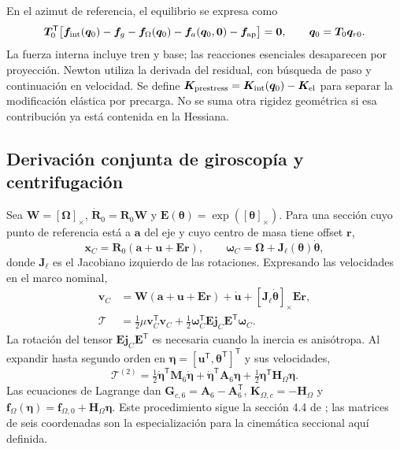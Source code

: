 \documentclass[oneside,a4paper,spanish,links,pagenumbers]{amca}
\newcommand{\Sx}[1]{[\bm{#1}]_\times}
\newcommand{\tr}{\mathsf T}
\begin{document}
En el azimut de referencia, el equilibrio se expresa como
\begin{equation}
 \bm T_0^\tr\big[\bm f_{\rm int}(\bm q_0)-\bm f_g-
 \bm f_\Omega(\bm q_0)-\bm f_a(\bm q_0,\bm0)-\bm f_{\rm ap}\big]=\bm0,
 \qquad \bm q_0=\bm T_0\bm q_{r0}.
 \label{eq:equilibrio}
\end{equation}
La fuerza interna incluye tren y base; las reacciones esenciales desaparecen por proyección. Newton utiliza la derivada del residual, con búsqueda de paso y continuación en velocidad. Se define $\bm K_{\rm prestress}=\bm K_{\rm int}(\bm q_0)-\bm K_{\rm el}$ para separar la modificación elástica por precarga. No se suma otra rigidez geométrica si esa contribución ya está contenida en la Hessiana.

\subsection{Derivación conjunta de giroscopía y centrifugación}
\label{sec:gyro}
Sea $\bm W=\Sx\Omega$, $\dot{\bm R}_0=\bm R_0\bm W$ y $\bm E(\bm\theta)=\exp(\Sx\theta)$. Para una sección cuyo punto de referencia está a $\bm a$ del eje y cuyo centro de masa tiene offset $\bm r$,
\begin{equation}
 \bm x_C=\bm R_0(\bm a+\bm u+\bm E\bm r),\qquad
 \bm\omega_C=\bm\Omega+\bm J_\ell(\bm\theta)\dot{\bm\theta},
\end{equation}
donde $\bm J_\ell$ es el Jacobiano izquierdo de las rotaciones. Expresando las velocidades en el marco nominal,
\begin{align}
 \bm v_C&=\bm W(\bm a+\bm u+\bm E\bm r)+\dot{\bm u}
       +[\bm J_\ell\dot{\bm\theta}]_\times\bm E\bm r,\\
 \mathcal T&=\tfrac12\mu\bm v_C^\tr\bm v_C
 +\tfrac12\bm\omega_C^\tr\bm E\bm j_C\bm E^\tr\bm\omega_C.
 \label{eq:energiaexacta}
\end{align}
La rotación del tensor $\bm E\bm j_C\bm E^\tr$ es necesaria cuando la inercia es anisótropa. Al expandir hasta segundo orden en $\bm\eta=[\bm u^\tr,\bm\theta^\tr]^\tr$ y sus velocidades,
\begin{equation}
 \mathcal T^{(2)}=\tfrac12\dot{\bm\eta}^\tr\bm M_6\dot{\bm\eta}
 +\dot{\bm\eta}^\tr\bm A_6\bm\eta
 +\tfrac12\bm\eta^\tr\bm H_\Omega\bm\eta.
 \label{eq:energia2}
\end{equation}
Las ecuaciones de Lagrange dan $\bm G_{c,6}=\bm A_6-\bm A_6^\tr$, $\bm K_{\Omega,c}=-\bm H_\Omega$ y $\bm f_\Omega(\bm\eta)=\bm f_{\Omega,0}+\bm H_\Omega\bm\eta$. Este procedimiento sigue la sección 4.4 de \citet{meirovitch1997}; las matrices de seis coordenadas son la especialización para la cinemática seccional aquí definida.
\end{document}
